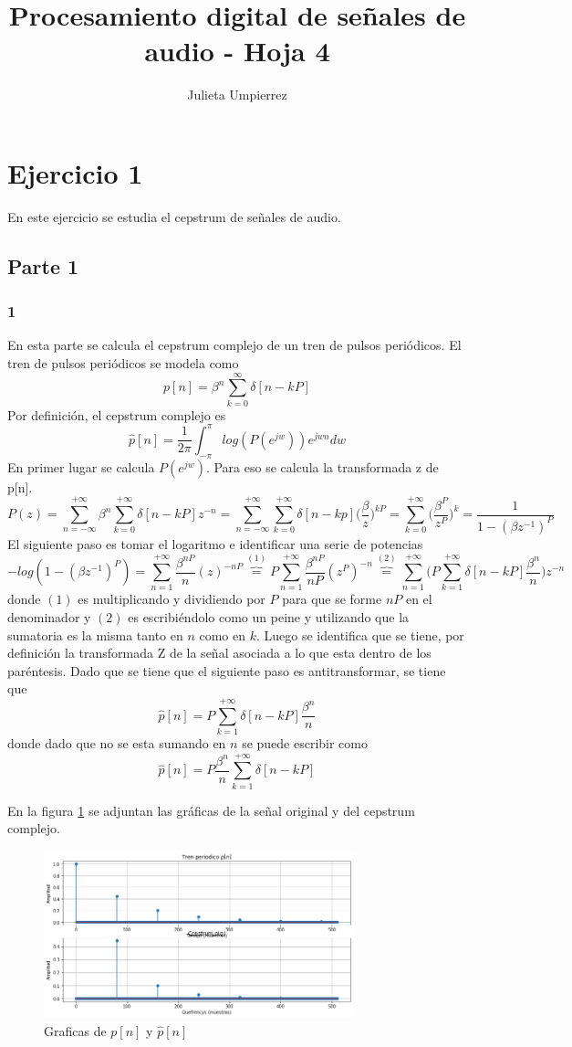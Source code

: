 \documentclass[a4paper]{article}
\title{Procesamiento digital de señales de audio - Hoja 4}
\author{Julieta Umpierrez}
\date{\vspace{-5ex}}
\begin{document}
\maketitle

\section{Ejercicio 1 }
En este ejercicio se estudia el cepstrum de señales de audio.
\subsection{Parte 1}
\subsubsection{1}
En esta parte se calcula el cepstrum complejo de un tren de pulsos periódicos. El tren de pulsos periódicos se modela como 
$$p[n]=\beta^n\sum_{k=0}^{\infty}\delta[n-kP]$$
Por definición, el cepstrum complejo es 
$$\hat{p}[n] = \frac{1}{2\pi} \int^{\pi}_{-\pi}log(P(e^{jw}))e^{jwn}dw$$
En primer lugar se calcula $P(e^{jw})$. Para eso se calcula la transformada z de p[n]. 
$$P(z) = \sum_{n=-\infty}^{+\infty}\beta^n\sum_{k=0}^{+\infty}\delta[n-kP]z^{-n}=\sum_{n=-\infty}^{+\infty}\sum_{k=0}^{+\infty}\delta[n-kp]\bigg(\frac{\beta}{z}\bigg)^{kP} = \sum_{k=0}^{+\infty} \bigg(\frac{\beta^P}{z^P}\bigg)^k = \frac{1}{1-(\beta z^{-1})^P}$$
El siguiente paso es tomar el logaritmo e identificar una serie de potencias
$$-log(1-(\beta z^{-1})^P) = \sum_{n=1}^{+\infty}\frac{\beta^{nP}}{n}(z)^{-nP} \overbrace{=}^{(1)}P\sum_{n=1}^{+\infty}\frac{\beta^{nP}}{nP}(z^P)^{-n} \overbrace{=}^{(2)} \sum_{n=1}^{+\infty}\bigg(P\sum_{k=1}^{+\infty} \delta[n-kP] \frac{\beta^{n}}{n}\bigg)z^{-n}$$
donde $(1)$ es multiplicando y dividiendo por $P$ para que se forme $nP$ en el denominador y $(2)$ es escribiéndolo como un peine y utilizando que la sumatoria es la misma tanto en $n$ como en $k$. Luego se identifica que se tiene, por definición la transformada Z de la señal asociada a lo que esta dentro de los paréntesis. Dado que se tiene que el siguiente paso es antitransformar, se tiene que 
$$\hat{p}[n] = P\sum_{k=1}^{+\infty} \delta[n-kP] \frac{\beta^{n}}{n}$$
donde dado que no se esta sumando en $n$ se puede escribir como 
$$\hat{p}[n] = P\frac{\beta^{n}}{n}\sum_{k=1}^{+\infty} \delta[n-kP] $$

En la figura \ref{phatp} se adjuntan las gráficas de la señal original y del cepstrum complejo.
\begin{figure}[h!]
\centering
\includegraphics[width=0.8\textwidth]{cepstrum1.png}
\caption{Graficas de $p[n]$ y $\hat{p}[n]$}
\label{phatp}
\end{figure}
\end{document}
